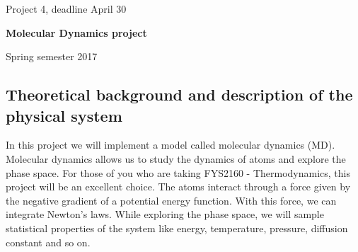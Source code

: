 \documentclass[%
oneside,                 %
final,                   %
10pt]{article}
\begin{document}

\newcommand{\exercisesection}[1]{\subsection*{#1}}






\thispagestyle{empty}

\begin{center}
{\LARGE\bf
\begin{spacing}{1.25}
Project 4, deadline  April 30
\end{spacing}
}
\end{center}


\begin{center}
{\bf Molecular Dynamics project${}^{}$} \\ [0mm]
\end{center}

\begin{center}
\end{center}
    

\begin{center}
Spring semester 2017
\end{center}

\vspace{1cm}


\subsection{Theoretical background and description of the physical system}
In this project we will implement a model called molecular dynamics (MD). Molecular dynamics allows us to study the dynamics of atoms and explore the phase space. For those of you who are taking FYS2160 - Thermodynamics, this project will be an excellent choice. The atoms interact through a force given by the negative gradient of a potential energy function. With this force, we can integrate Newton's laws. While exploring the phase space, we will sample statistical properties of the system like energy, temperature, pressure, diffusion constant and so on.
\end{document}
